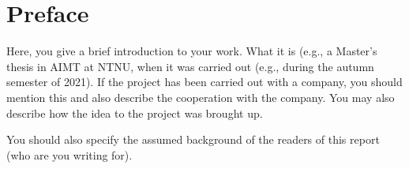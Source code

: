 \hypersetup{pageanchor=false}
%

\chapter*{Preface}
Here, you give a brief introduction to your work. What it is (e.g., a Master's thesis in AIMT at NTNU, when it was carried out (e.g., during the autumn semester of 2021). If the project has been carried out with a company, you should mention this and also describe the cooperation with the company. You may also describe how the idea to the project was brought up.

You should also specify the assumed background of the readers of this report (who are you writing for).\\[2cm]

\thesisdate \\[1pc]
\\[1pc]
